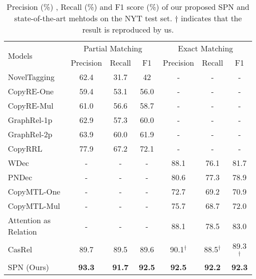 \documentclass[letterpaper]{article} \usepackage{aaai21}  \usepackage{times}  \usepackage{helvet} \usepackage{courier}  \usepackage[hyphens]{url}  \usepackage{graphicx} \usepackage{amsfonts,amssymb}
\begin{document}
\begin{table*}[thbp]
\begin{center}
\begin{tabular}{l|ccc|ccc}
\hline
\multirow{2}{*}{Models}               & \multicolumn{3}{c|}{Partial Matching} & \multicolumn{3}{c}{Exact Matching} \\\cline{2-7}

                                      & Precision    & Recall    & F1     & Precision   & Recall   & F1     \\
                                      \hline\hline
NovelTagging \cite{zheng2017joint}     & 62.4         & 31.7      & 42     & -            &  -        &   -     \\
CopyRE-One \cite{zeng2018extracting}   & 59.4         & 53.1      & 56.0   &   -          &    -      &   -     \\
CopyRE-Mul\cite{zeng2018extracting} & 61.0         & 56.6      & 58.7   &  -           &     -     &    -    \\
GraphRel-1p \cite{fu2019graphrel}          & 62.9         & 57.3      & 60.0   & -            & -         &    -    \\
GraphRel-2p \cite{fu2019graphrel}            & 63.9         & 60.0      & 61.9   &        -     &      -    &      -  \\
CopyRRL \cite{zeng2019learning}          & 77.9         & 67.2      & 72.1   &           -  &    -      &   -     \\
WDec\cite{nayak2019ptrnetdecoding}     &   -           &  -         &  -                    &88.1         & 76.1      & 81.7        \\
PNDec\cite{nayak2019ptrnetdecoding} &   -           &  -         &  -                    &80.6         & 77.3      & 78.9        \\
CopyMTL-One \cite{zeng2020copymtl} &-&-&-&72.7 &69.2 &70.9 \\
CopyMTL-Mul \cite{zeng2020copymtl} &-   &- &- &  75.7 &68.7 &72.0 \\
Attention as Relation \cite{ijcai2020-524} &-&-&-&88.1& 78.5& 83.0\\
CasRel \cite{wei-etal-2020-novel}                        & 89.7         & 89.5      & 89.6   & 90.1$ ^\dag$       & 88.5$ ^\dag$    & 89.3 $ ^\dag$\\
\hline
    SPN (Ours)                                  & \textbf{93.3}         & \textbf{91.7}      & \textbf{92.5}   &  \textbf{92.5}           &   \textbf{92.2}       & \textbf{92.3}    \\  
\hline
\end{tabular}
\caption{Precision (\%) , Recall (\%)  and F1 score (\%) of our proposed SPN and state-of-the-art mehtods on the NYT test set. $\dag$ indicates that the result is reproduced by us.}
\label{NYT_result}
\end{center}
\end{table*}
\end{document}
